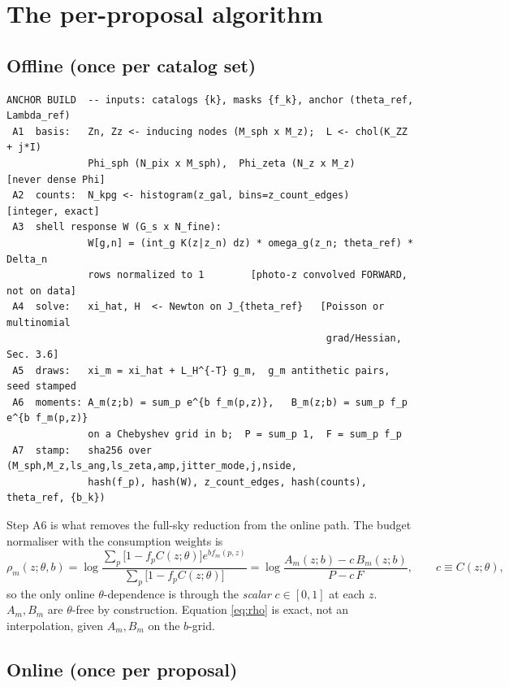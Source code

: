 \section{The per-proposal algorithm}
\label{sec:algo}

\subsection{Offline (once per catalog set)}

\begin{verbatim}
ANCHOR BUILD  -- inputs: catalogs {k}, masks {f_k}, anchor (theta_ref, Lambda_ref)
 A1  basis:   Zn, Zz <- inducing nodes (M_sph x M_z);  L <- chol(K_ZZ + j*I)
              Phi_sph (N_pix x M_sph),  Phi_zeta (N_z x M_z)     [never dense Phi]
 A2  counts:  N_kpg <- histogram(z_gal, bins=z_count_edges)      [integer, exact]
 A3  shell response W (G_s x N_fine):
              W[g,n] = (int_g K(z|z_n) dz) * omega_g(z_n; theta_ref) * Delta_n
              rows normalized to 1        [photo-z convolved FORWARD, not on data]
 A4  solve:   xi_hat, H  <- Newton on J_{theta_ref}   [Poisson or multinomial
                                                       grad/Hessian, Sec. 3.6]
 A5  draws:   xi_m = xi_hat + L_H^{-T} g_m,  g_m antithetic pairs, seed stamped
 A6  moments: A_m(z;b) = sum_p e^{b f_m(p,z)},   B_m(z;b) = sum_p f_p e^{b f_m(p,z)}
              on a Chebyshev grid in b;  P = sum_p 1,  F = sum_p f_p
 A7  stamp:   sha256 over (M_sph,M_z,ls_ang,ls_zeta,amp,jitter_mode,j,nside,
              hash(f_p), hash(W), z_count_edges, hash(counts), theta_ref, {b_k})
\end{verbatim}

\noindent Step A6 is what removes the full-sky reduction from the online path.
The budget normaliser with the consumption weights is
\begin{equation}
  \rho_m(z;\theta,b)=\log\frac{\sum_p\big[1-f_pC(z;\theta)\big]e^{b f_m(p,z)}}
                              {\sum_p\big[1-f_pC(z;\theta)\big]}
  =\log\frac{A_m(z;b)-c\,B_m(z;b)}{P-c\,F},
  \qquad c\equiv C(z;\theta),
  \label{eq:rho}
\end{equation}
so the only online $\theta$-dependence is through the \emph{scalar} $c\in[0,1]$
at each $z$.  $A_m,B_m$ are $\theta$-free by construction.  Equation
\eqref{eq:rho} is exact, not an interpolation, given $A_m,B_m$ on the $b$-grid.

\subsection{Online (once per proposal)}

